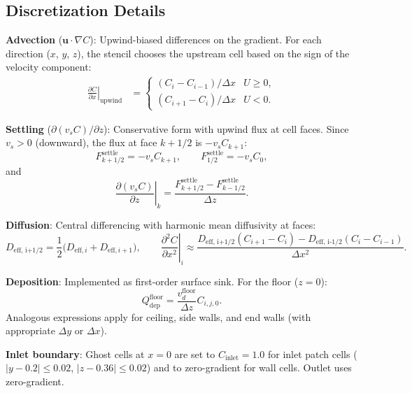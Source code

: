 \documentclass[12pt]{article}
\begin{document}
\subsection{Discretization Details}

\textbf{Advection} ($\mathbf{u} \cdot \nabla C$): Upwind-biased differences on the gradient. For each direction ($x$, $y$, $z$), the stencil chooses the upstream cell based on the sign of the velocity component:
\begin{align}
    \left.\frac{\partial C}{\partial x}\right|_\text{upwind} &= \begin{cases} (C_i - C_{i-1}) / \Delta x & U \ge 0, \\ (C_{i+1} - C_i) / \Delta x & U < 0. \end{cases}
\end{align}

\textbf{Settling} ($\partial(v_s C)/\partial z$): Conservative form with upwind flux at cell faces. Since $v_s > 0$ (downward), the flux at face $k+1/2$ is $-v_s C_{k+1}$:
\begin{equation}
    F^\text{settle}_{k+1/2} = -v_s C_{k+1}, \qquad F^\text{settle}_{1/2} = -v_s C_0,
\end{equation}
and
\begin{equation}
    \left.\frac{\partial(v_s C)}{\partial z}\right|_k = \frac{F^\text{settle}_{k+1/2} - F^\text{settle}_{k-1/2}}{\Delta z}.
\end{equation}

\textbf{Diffusion}: Central differencing with harmonic mean diffusivity at faces:
\begin{equation}
    D_\text{eff, i+1/2} = \frac{1}{2}\bigl(D_{\text{eff},i} + D_{\text{eff},i+1}\bigr), \qquad \left.\frac{\partial^2 C}{\partial x^2}\right|_i \approx \frac{D_\text{eff, i+1/2}(C_{i+1}-C_i) - D_\text{eff, i-1/2}(C_i-C_{i-1})}{\Delta x^2}.
\end{equation}

\textbf{Deposition}: Implemented as first-order surface sink. For the floor ($z=0$):
\begin{equation}
    Q_\text{dep}^\text{floor} = \frac{v_d^\text{floor}}{\Delta z} C_{i,j,0}.
\end{equation}
Analogous expressions apply for ceiling, side walls, and end walls (with appropriate $\Delta y$ or $\Delta x$).

\textbf{Inlet boundary}: Ghost cells at $x=0$ are set to $C_\text{inlet} = 1.0$ for inlet patch cells ($|y-0.2| \le 0.02$, $|z-0.36| \le 0.02$) and to zero-gradient for wall cells. Outlet uses zero-gradient.
\end{document}
